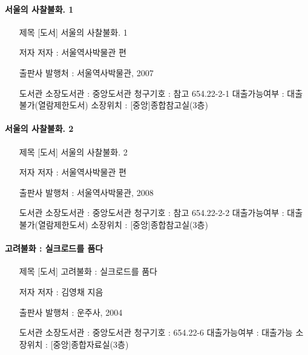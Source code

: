 \documentclass[12pt, a4paper, oneside]{book}
\begin{document}
\paragraph{ 서울의 사찰불화. 1}

\begin{itemize}[					
		topsep=0.0em,			
		parsep=0.0em,			
		itemsep=0em,			
		leftmargin=	5	em,
		labelwidth=	1	em,			
		labelsep=		1	 em			
]					
	\item	[제목]	[도서] 서울의 사찰불화. 1	\item	[저자]	저자 : 서울역사박물관 편	\item	[출판사]	발행처 : 서울역사박물관, 2007	\item	[도서관]	소장도서관 : 중앙도서관	청구기호 : 참고 654.22-2-1	대출가능여부 : 대출불가(열람제한도서)	소장위치 : [중앙]종합참고실(3층)
\end{itemize}					


\paragraph{ 서울의 사찰불화. 2 }

\begin{itemize}[					
		topsep=0.0em,			
		parsep=0.0em,			
		itemsep=0em,			
		leftmargin=	5	em,
		labelwidth=	1	em,			
		labelsep=		1	 em			
]					
	\item	[제목]	[도서] 서울의 사찰불화. 2	\item	[저자]	저자 : 서울역사박물관 편	\item	[출판사]	발행처 : 서울역사박물관, 2008	\item	[도서관]	소장도서관 : 중앙도서관	청구기호 : 참고 654.22-2-2	대출가능여부 : 대출불가(열람제한도서)	소장위치 : [중앙]종합참고실(3층)
\end{itemize}					


\paragraph{ 고려불화 : 실크로드를 품다 }

\begin{itemize}[					
		topsep=0.0em,			
		parsep=0.0em,			
		itemsep=0em,			
		leftmargin=	5	em,
		labelwidth=	1	em,			
		labelsep=		1	 em			
]					
	\item	[제목]	[도서] 고려불화 : 실크로드를 품다	\item	[저자]	저자 : 김영채 지음	\item	[출판사]	발행처 : 운주사, 2004	\item	[도서관]	소장도서관 : 중앙도서관	청구기호 : 654.22-6	대출가능여부 : 대출가능	소장위치 : [중앙]종합자료실(3층)
\end{itemize}					
\end{document}
